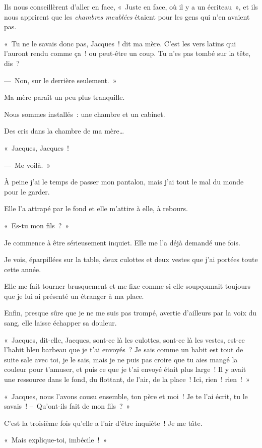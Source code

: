 \documentclass[french,twoside]{book} %
\begin{document}
Ils nous conseillèrent d’aller en face, « Juste en face, où il y a un écriteau », et ils nous apprirent que les \emph{chambres meublées} étaient pour les gens qui n’en avaient pas.\par
« Tu ne le savais donc pas, Jacques ! dit ma mère. C’est les vers latins qui l’auront rendu comme ça ! ou peut-être un coup. Tu n’es pas tombé sur la tête, dis ?\par
— Non, sur le derrière seulement. »\par
Ma mère paraît un peu plus tranquille.\par
\bigbreak
\noindent Nous sommes installés : une chambre et un cabinet.\par
Des cris dans la chambre de ma mère…\par
« Jacques, Jacques !\par
— Me voilà. »\par
À peine j’ai le temps de passer mon pantalon, mais j’ai tout le mal du monde pour le garder.\par
Elle l’a attrapé par le fond et elle m’attire à elle, à rebours.\par
« Es-tu mon fils ? »\par
Je commence à être sérieusement inquiet. Elle me l’a déjà demandé une fois.\par
Je vois, éparpillées sur la table, deux culottes et deux vestes que j’ai portées toute cette année.\par
Elle me fait tourner brusquement et me fixe comme si elle soupçonnait toujours que je lui ai présenté un étranger à ma place.\par
Enfin, presque sûre que je ne me suis pas trompé, avertie d’ailleurs par la voix du sang, elle laisse échapper sa douleur.\par
« Jacques, dit-elle, Jacques, sont-ce là les culottes, sont-ce là les vestes, est-ce l’habit bleu barbeau que je t’ai envoyés ? Je sais comme un habit est tout de suite sale avec toi, je le sais, mais je ne puis pas croire que tu aies mangé la couleur pour t’amuser, et puis ce que je t’ai envoyé était plus large ! Il y avait une ressource dans le fond, du flottant, de l’air, de la place ! Ici, rien ! rien ! »\par
« Jacques, nous l’avons cousu ensemble, ton père et moi ! Je te l’ai écrit, tu le savais ! – Qu’ont-ils fait de mon fils ? »\par
C’est la troisième fois qu’elle a l’air d’être inquiète ! Je me tâte.\par
« Mais explique-toi, imbécile ! »\par
\end{document}
